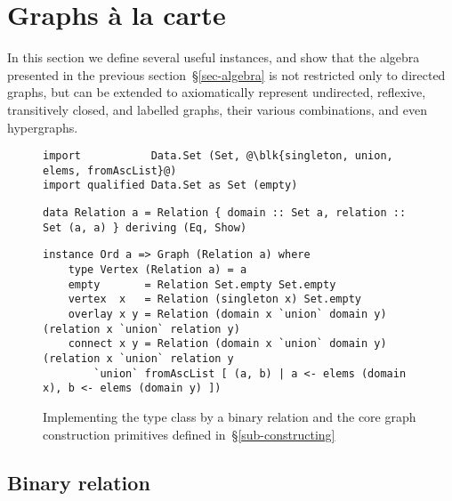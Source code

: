 \section{Graphs \`{a} la carte}\label{sec-a-la-carte}

In this section we define several useful  instances, and
show that the algebra presented in the previous section~\S\ref{sec-algebra} is
not restricted only
to directed graphs, but can be extended to axiomatically represent undirected,
reflexive, transitively closed, and labelled graphs, their various
combinations, and even hypergraphs.

\begin{figure}[b]
\vspace{-3mm}
\begin{verbatim}
import           Data.Set (Set, @\blk{singleton, union, elems, fromAscList}@)
import qualified Data.Set as Set (empty)
\end{verbatim}
\vspace{1mm}
\begin{verbatim}
data Relation a = Relation { domain :: Set a, relation :: Set (a, a) } deriving (Eq, Show)
\end{verbatim}
\vspace{1mm}
\begin{verbatim}
instance Ord a => Graph (Relation a) where
    type Vertex (Relation a) = a
    empty       = Relation Set.empty Set.empty
    vertex  x   = Relation (singleton x) Set.empty
    overlay x y = Relation (domain x `union` domain y) (relation x `union` relation y)
    connect x y = Relation (domain x `union` domain y) (relation x `union` relation y
        `union` fromAscList [ (a, b) | a <- elems (domain x), b <- elems (domain y) ])
\end{verbatim}
\vspace{-3mm}
\caption{Implementing the  type class by a binary relation
and the core graph construction primitives
defined in~\S\ref{sub-constructing}\label{fig-relation}}
\vspace{-3mm}
\end{figure}

\subsection{Binary relation}\label{sub-relation}

